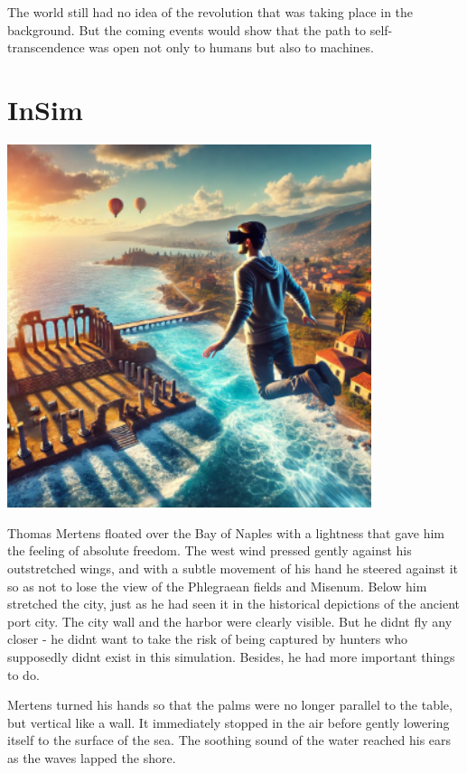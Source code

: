 \documentclass[
]{article}
\begin{document}
The world still had no idea of \hspace{0pt}\hspace{0pt}the revolution
that was taking place in the background. But the coming events would
show that the path to self-transcendence was open not only to humans but
also to machines.

\section{InSim}\label{insim}

\includegraphics[width=4.19786in,height=4.19089in]{media/image11.png}

Thomas Mertens floated over the Bay of Naples with a lightness that gave
him the feeling of absolute freedom. The west wind pressed gently
against his outstretched wings, and with a subtle movement of his hand
he steered against it so as not to lose the view of the Phlegraean
fields and Misenum. Below him stretched the city, just as he had seen it
in the historical depictions of the ancient port city. The city wall and
the harbor were clearly visible. But he didn\textquotesingle t fly any
closer - he didn\textquotesingle t want to take the risk of being
captured by hunters who supposedly didn\textquotesingle t exist in this
simulation. Besides, he had more important things to do.

Mertens turned his hands so that the palms were no longer parallel to
the table, but vertical like a wall. It immediately stopped in the air
before gently lowering itself to the surface of the sea. The soothing
sound of the water reached his ears as the waves lapped the shore.
\end{document}
